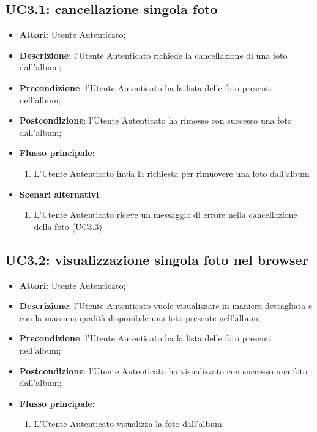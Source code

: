 
\subsection{UC3.1: cancellazione singola foto}
\label{uc:uc3.1}
\hypertarget{UC3.1}{}


\begin{itemize}
  \item \textbf{Attori}: Utente Autenticato;
  \item \textbf{Descrizione}: l'Utente Autenticato richiede la cancellazione di
una foto dall'album;
  \item \textbf{Precondizione}: l'Utente Autenticato ha la lista delle foto
presenti nell'album;
  \item \textbf{Postcondizione}: l'Utente Autenticato ha rimosso con successo
una foto dall'album;
  \item \textbf{Flusso principale}:
  \begin{enumerate}
    \item L'Utente Autenticato invia la richiesta per rimuovere una foto
dall'album
  \end{enumerate}
  \item \textbf{Scenari alternativi}:
  \begin{enumerate}
    \item L'Utente Autenticato riceve un messaggio di errore nella
cancellazione della foto (\hyperlink{UC3.3}{UC3.3})
  \end{enumerate}
\end{itemize}



\subsection{UC3.2: visualizzazione singola foto nel browser}
\label{uc:uc3.2}
\hypertarget{UC3.2}{}

\begin{itemize}
  \item \textbf{Attori}: Utente Autenticato;
  \item \textbf{Descrizione}: l'Utente Autenticato vuole visualizzare in maniera
dettagliata e con la massima qualità disponibile una foto presente nell'album;
  \item \textbf{Precondizione}: l'Utente Autenticato ha la lista delle foto
presenti nell'album;
  \item \textbf{Postcondizione}: l'Utente Autenticato ha visualizzato con
successo una foto dall'album;
  \item \textbf{Flusso principale}:
  \begin{enumerate}
    \item L'Utente Autenticato visualizza la foto dall'album
  \end{enumerate}
\end{itemize}



